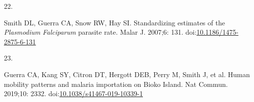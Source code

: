 \documentclass[
]{book}
\newlength{\cslhangindent}
\newlength{\csllabelwidth}
\newlength{\cslentryspacingunit} %
\newenvironment{CSLReferences}[2] %
 {%
  \setlength{\parindent}{0pt}
  \ifodd #1
  \let\oldpar\par
  \def\par{\hangindent=\cslhangindent\oldpar}
  \fi
  \setlength{\parskip}{#2\cslentryspacingunit}
 }%
 {}
\newcommand{\CSLLeftMargin}[1]{\parbox[t]{\csllabelwidth}{#1}}
\newcommand{\CSLRightInline}[1]{\parbox[t]{\linewidth - \csllabelwidth}{#1}\break}
\begin{document}
\begin{CSLReferences}{0}{0}
\leavevmode{}%
\CSLLeftMargin{22. }%
\CSLRightInline{Smith DL, Guerra CA, Snow RW, Hay SI. Standardizing estimates of the {\emph{Plasmodium}}{ \emph{Falciparum}} parasite rate. Malar J. 2007;6: 131. doi:\href{https://doi.org/10.1186/1475-2875-6-131}{10.1186/1475-2875-6-131}}

\leavevmode{}%
\CSLLeftMargin{23. }%
\CSLRightInline{Guerra CA, Kang SY, Citron DT, Hergott DEB, Perry M, Smith J, et al. Human mobility patterns and malaria importation on {Bioko Island}. Nat Commun. 2019;10: 2332. doi:\href{https://doi.org/10.1038/s41467-019-10339-1}{10.1038/s41467-019-10339-1}}

\end{CSLReferences}
\end{document}
